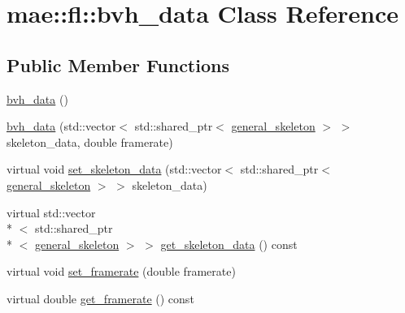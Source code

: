 \hypertarget{classmae_1_1fl_1_1bvh__data}{\section{mae\-:\-:fl\-:\-:bvh\-\_\-data Class Reference}
\label{classmae_1_1fl_1_1bvh__data}
}
\subsection*{Public Member Functions}
\begin{DoxyCompactItemize}
\item 
\hyperlink{classmae_1_1fl_1_1bvh__data_ab226198318b7c9875859e32e1177f4b6}{bvh\-\_\-data} ()
\item 
\hyperlink{classmae_1_1fl_1_1bvh__data_a0ad97b6e7075f4d012f117c7b0a77ccf}{bvh\-\_\-data} (std\-::vector$<$ std\-::shared\-\_\-ptr$<$ \hyperlink{classmae_1_1general__skeleton}{general\-\_\-skeleton} $>$ $>$ skeleton\-\_\-data, double framerate)
\item 
virtual void \hyperlink{classmae_1_1fl_1_1bvh__data_a293b49ea8821396d53343e1d74932c7e}{set\-\_\-skeleton\-\_\-data} (std\-::vector$<$ std\-::shared\-\_\-ptr$<$ \hyperlink{classmae_1_1general__skeleton}{general\-\_\-skeleton} $>$ $>$ skeleton\-\_\-data)
\item 
virtual std\-::vector\\*
$<$ std\-::shared\-\_\-ptr\\*
$<$ \hyperlink{classmae_1_1general__skeleton}{general\-\_\-skeleton} $>$ $>$ \hyperlink{classmae_1_1fl_1_1bvh__data_a63387acec7f40a4d522431f230c3b176}{get\-\_\-skeleton\-\_\-data} () const 
\item 
virtual void \hyperlink{classmae_1_1fl_1_1bvh__data_ad45dbef39601bf13bdb5adb028bce7b6}{set\-\_\-framerate} (double framerate)
\item 
virtual double \hyperlink{classmae_1_1fl_1_1bvh__data_ac9a1b37a485109b965aae1c024215ddc}{get\-\_\-framerate} () const 
\end{DoxyCompactItemize}


